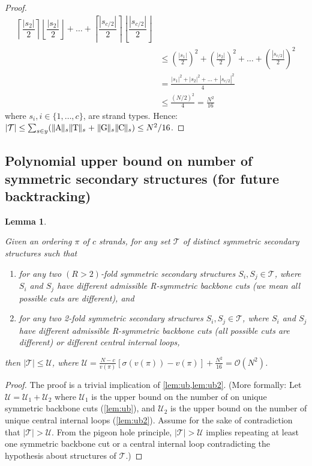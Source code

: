 \documentclass[11pt,letterpaper]{article}  \usepackage[margin=1in]{geometry}
\newtheorem{lemma}[theorem]{Lemma}
\theoremstyle{definition}  \newtheorem{Definition}[theorem]{Definition}
\begin{document}
\begin{proof}
\begin{align*}
		\left\lceil\dfrac{|s_2|}{2}\right\rceil
		\left\lfloor\dfrac{|s_2|}{2}\right\rfloor + \ldots + 
		\left\lceil\dfrac{|s_{c/2}|}{2}\right\rceil
		\left\lfloor\dfrac{|s_{c/2}|}{2}\right\rfloor \\
		& \leq 
		\left(\frac{|s_1|}{2}\right)^2 + \left(\frac{|s_2|}{2}\right)^2 + \ldots + \left(\frac{|s_{c/2}|}{2}\right)^2 \\
		&= 
		\frac{|s_1|^2 + |s_2|^2 + \ldots + |s_{c/2}|^2}{4} \\
		& \leq 
		\frac{(N/2)^2}{4} 
		=
		\frac{N^2}{16} 
	\end{align*}
	where $s_i, i \in \{1,\ldots,c\}$, are strand types. 
	Hence:  	 $ |\mathcal{T}| \leq \sum_{s\in y} (\parallel\! \! \baseA \!\! \parallel_s \parallel\! \! \baseT \!\! \parallel_s+ \parallel\! \! \baseG \!\! \parallel_s\parallel\! \! \baseC \!\! \parallel_s ) \leq N^2/16$. 
\end{proof}









\subsection{Polynomial upper bound on number of symmetric secondary structures (for future backtracking)}
\begin{lemma}\label{lem:polyub}
	
	Given an ordering $\pi$ of $c$ strands, 
	for any set $\mathcal{T}$ of distinct symmetric secondary structures such that 
	\begin{enumerate}
		\item  for any two $(R>2)$-fold symmetric secondary structures $S_i, S_j \in \mathcal{T}$, where $S_i$ and $S_j$ have different admissible R-symmetric backbone cuts (we mean all possible cuts are different), 	
		and 
		\item 
		for any two 2-fold symmetric secondary structures $S_i, S_j \in \mathcal{T}$, where $S_i$ and $S_j$ have different admissible R-symmetric backbone cuts (all possible cuts are different)
		or  different central internal loops, 
	\end{enumerate}
	then $|\mathcal{T}| \leq \mathcal{U}$, where $\mathcal{U} =  \frac{N-c}{v(\pi)} \left[ \sigma(v(\pi))-v(\pi) \right] + \frac{N^2}{16} = \mathcal{O}(N^2)$. 
\end{lemma}

\begin{proof}
	The proof is a trivial  implication of \cref{lem:ub,lem:ub2}.  
	(More formally: Let $\mathcal{U}= \mathcal{U}_1+\mathcal{U}_2$ where 
	$\mathcal{U}_1$ is the upper bound on the number of on unique symmetric backbone cuts (\cref{lem:ub}),
	and
	$\mathcal{U}_2$ is the upper bound on the number of unique central internal loops (\cref{lem:ub2}). 
	Assume for the sake of contradiction that $ |\mathcal{T}| > \mathcal{U}$. 
	From the pigeon hole principle, $|\mathcal{T}| > \mathcal{U}$ implies repeating at least one symmetric backbone cut or a central internal loop contradicting the hypothesis about structures of $\mathcal{T}$.)
\end{proof}
\end{document}
